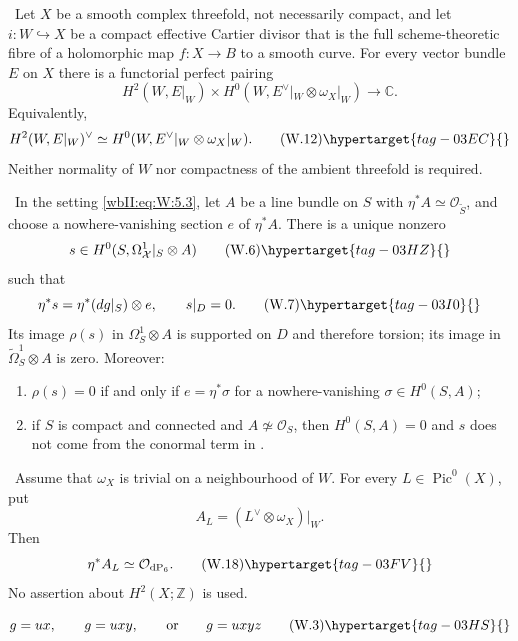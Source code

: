 \begin{proposition}
\hypertarget{tag-03IJ}{}\label{wbII:prop:cartier-duality-absolute}


\ Let $X$ be a smooth complex threefold, not necessarily compact,
and let $i:W\hookrightarrow X$ be a compact effective Cartier divisor that
is the full scheme-theoretic fibre of a holomorphic map $f:X\to B$ to a
smooth curve.  For every vector bundle $E$ on $X$ there is a functorial
perfect pairing
\[
 H^2(W,E|_W)\times
 H^0(W,E^\vee|_W\otimes\omega_X|_W)\longrightarrow\mathbb C.
\]
Equivalently,
\[
 H^2(W,E|_W)^\vee\simeq
 H^0(W,E^\vee|_W\otimes\omega_X|_W).
\tag{W.12}\hypertarget{tag-03EC}{}\label{wbII:eq:W:5.15a}
\]
Neither normality of $W$ nor compactness of the ambient threefold is
required.
\end{proposition}

\begin{theorem}
\hypertarget{tag-03IK}{}\label{wbII:prop:conductor}

\label{wbII:prop:conductor-differential}
\ In the setting \eqref{wbII:eq:W:5.3}, let $A$ be a line bundle on $S$ with
$\eta^*A\simeq\mathcal O_{\widetilde S}$, and choose a nowhere-vanishing
section $e$ of $\eta^*A$.  There is a unique nonzero
\[
s\in H^0(S,\Omega^1_{\mathcal X}|_S\otimes A)
\tag{W.6}\hypertarget{tag-03HZ}{}\label{wbII:eq:W:5.6}
\]
such that
\[
\eta^*s=\eta^*(dg|_S)\otimes e,\qquad s|_D=0.
\tag{W.7}\hypertarget{tag-03I0}{}\label{wbII:eq:W:5.7}
\]
Its image $\rho(s)$ in $\Omega^1_S\otimes A$ is supported on $D$ and
therefore torsion; its image in
$\widetilde\Omega^1_S\otimes A$ is zero.  Moreover:
\begin{enumerate}[label=(\alph*)]
\item $\rho(s)=0$ if and only if $e=\eta^*\sigma$ for a nowhere-vanishing
$\sigma\in H^0(S,A)$;
\item if $S$ is compact and connected and $A\not\simeq\mathcal O_S$, then
$H^0(S,A)=0$ and $s$ does not come from the conormal term in .
\end{enumerate}
\end{theorem}

\begin{proposition}
\hypertarget{tag-03IO}{}\label{wbII:prop:pic0-pullback}


\ Assume that $\omega_X$ is trivial on a neighbourhood of $W$.
For every $L\in\operatorname{Pic}^0(X)$, put
\[
 A_L=(L^\vee\otimes\omega_X)|_W.
\]
Then
\[
 \eta^*A_L\simeq\mathcal O_{\mathrm{dP}_6}.
\tag{W.18}\hypertarget{tag-03FV}{}\label{wbII:eq:W:5.17a}
\]
No assertion about $H^2(X;\mathbb Z)$ is used.
\end{proposition}

\[
g=ux,\qquad g=uxy,\qquad\text{or}\qquad g=uxyz
\tag{W.3}\hypertarget{tag-03HS}{}\label{wbII:eq:W:5.3}
\]

